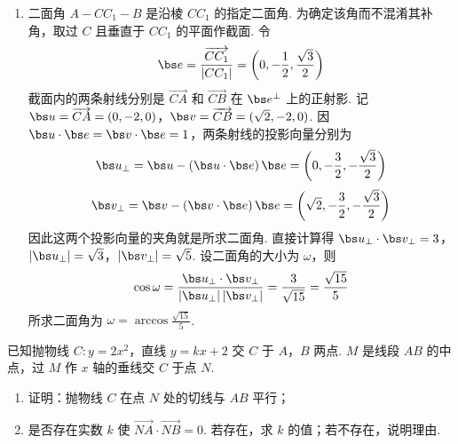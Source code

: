 \begin{solution}
\begin{enumerate}
\item 二面角 \(A-CC_{1}-B\) 是沿棱 \(CC_{1}\) 的指定二面角. 为确定该角而不混淆其补角，取过 \(C\) 且垂直于 \(CC_{1}\) 的平面作截面. 令
\[
\bs e=\frac{\overrightarrow{CC_{1}}}{|CC_{1}|}=\left(0,-\frac12,\frac{\sqrt{3}}2\right)
\]
截面内的两条射线分别是 \(\overrightarrow{CA}\) 和 \(\overrightarrow{CB}\) 在 \(\bs e^\perp\) 上的正射影. 记
\(\bs u=\overrightarrow{CA}=(0,-2,0)\)，\(\bs v=\overrightarrow{CB}=(\sqrt{2},-2,0)\).
因 \(\bs u\cdot\bs e=\bs v\cdot\bs e=1\)，两条射线的投影向量分别为
\[
\bs u_{\perp}=\bs u-\left(\bs u\cdot\bs e\right)\bs e=\left(0,-\frac32,-\frac{\sqrt{3}}2\right)
\]
\[
\bs v_{\perp}=\bs v-\left(\bs v\cdot\bs e\right)\bs e=\left(\sqrt{2},-\frac32,-\frac{\sqrt{3}}2\right)
\]
因此这两个投影向量的夹角就是所求二面角. 直接计算得
\(\bs u_{\perp}\cdot\bs v_{\perp}=3\)，\(|\bs u_{\perp}|=\sqrt{3}\)，\(|\bs v_{\perp}|=\sqrt{5}\).
设二面角的大小为 \(\omega\)，则
\[
\cos\omega=\frac{\bs u_{\perp}\cdot\bs v_{\perp}}{|\bs u_{\perp}|\,|\bs v_{\perp}|}
=\frac{3}{\sqrt{15}}=\frac{\sqrt{15}}{5}
\]
所求二面角为 \(\omega=\arccos\frac{\sqrt{15}}{5}\).
\end{enumerate}
\end{solution}

\begin{problem}
已知抛物线 \(C: y = 2x^2\)，直线 \(y = kx + 2\) 交 \(C\) 于 \(A\)，\(B\) 两点. \(M\) 是线段 \(AB\) 的中点，过 \(M\) 作 \(x\) 轴的垂线交 \(C\) 于点 \(N\).
\begin{enumerate}
\item 证明：抛物线 \(C\) 在点 \(N\) 处的切线与 \(AB\) 平行；
\item 是否存在实数 \(k\) 使 \(\overrightarrow{NA} \cdot \overrightarrow{NB} = 0\). 若存在，求 \(k\) 的值；若不存在，说明理由.
\end{enumerate}
\end{problem}

